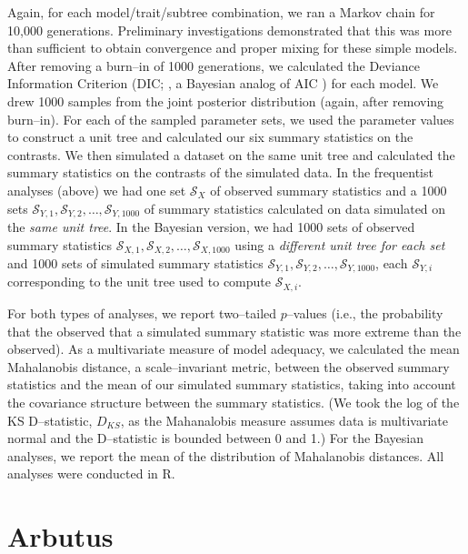 \documentclass[a4paper,12pt]{article}
\begin{document}
Again, for each model/trait/subtree combination, we ran a Markov chain for 10,000 generations. Preliminary investigations demonstrated that this was more than sufficient to obtain convergence and proper mixing for these simple models. After removing a burn--in of 1000 generations, we calculated the Deviance Information Criterion (DIC; \citep{dic}, a Bayesian analog of AIC \citep{Gelman2013}) for each model. We drew 1000 samples from the joint posterior distribution (again, after removing burn--in). For each of the sampled parameter sets, we used the parameter values to construct a unit tree and calculated our six summary statistics on the contrasts. We then simulated a dataset on the same unit tree and calculated the summary statistics on the contrasts of the simulated data. In the frequentist analyses (above) we had one set $\mathcal{S}_X$ of observed summary statistics and a 1000 sets $\mathcal{S}_{Y,1}, \mathcal{S}_{Y,2}, \ldots, \mathcal{S}_{Y,1000}$ of summary statistics calculated on data simulated on the \emph{same unit tree}. In the Bayesian version, we had 1000 sets of observed summary statistics $\mathcal{S}_{X,1}, \mathcal{S}_{X,2}, \ldots, \mathcal{S}_{X,1000}$ using a \emph{different unit tree for each set} and 1000 sets of simulated summary statistics $\mathcal{S}_{Y,1}, \mathcal{S}_{Y,2}, \ldots, \mathcal{S}_{Y,1000}$, each $\mathcal{S}_{Y,i}$ corresponding to the unit tree used to compute $\mathcal{S}_{X,i}$.
 
For both types of analyses, we report two--tailed $p$--values (i.e., the probability that the observed that a simulated summary statistic was more extreme than the observed). As a multivariate measure of model adequacy, we calculated the mean Mahalanobis distance, a scale--invariant metric, between the observed summary statistics and the mean of our simulated summary statistics, taking into account the covariance structure between the summary statistics. (We took the log of the KS D--statistic, $D_{KS}$, as the Mahanalobis measure assumes data is multivariate normal and the D--statistic is bounded between 0 and 1.) For the Bayesian analyses, we report the mean of the distribution of Mahalanobis distances. All analyses were conducted in R.

\section{Arbutus}
\end{document}
